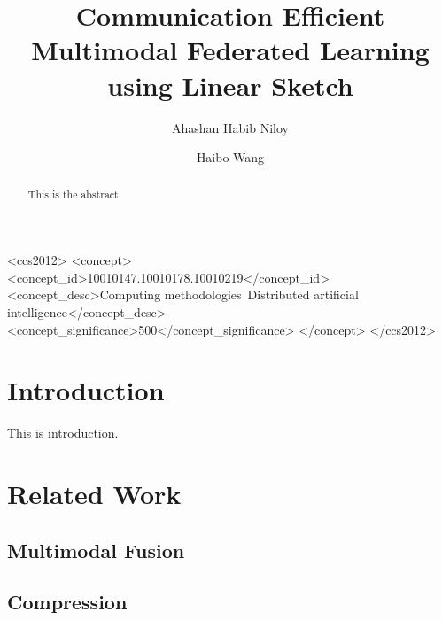 \documentclass[sigconf]{acmart}
\begin{document}
\title{Communication Efficient Multimodal Federated Learning using Linear Sketch}

\author{Ahashan Habib Niloy}

\author{Haibo Wang}

\renewcommand{\shortauthors}{Niloy and Wang}

\begin{abstract}
This is the abstract.
\end{abstract}

\begin{CCSXML}
<ccs2012>
 <concept>
  <concept_id>10010147.10010178.10010219</concept_id>
  <concept_desc>Computing methodologies~Distributed artificial intelligence</concept_desc>
  <concept_significance>500</concept_significance>
 </concept>
</ccs2012>
\end{CCSXML}



\maketitle


\section{Introduction}
This is introduction.

\section{Related Work}

\subsection{Multimodal Fusion}

\subsection{Compression}
\end{document}
